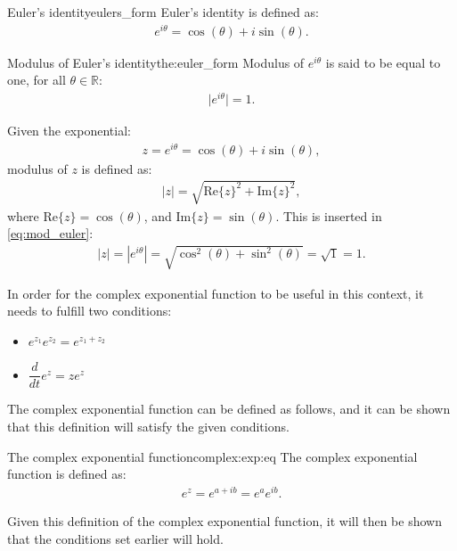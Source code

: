 \begin{definition}{Euler's identity}{eulers_form}
Euler's identity is defined as: \cite[p.~231]{diffandcomplex}
\begin{align}
e^{i\theta}=\cos(\theta)+ i \sin(\theta).
\end{align} 
\end{definition}
\begin{theorem}{Modulus of Euler's identity}{the:euler_form}
Modulus of $e^{i\theta}$ is said to be equal to one, for all $\theta \in \mathbb{R}$:
\begin{align*}
\big|e^{i\theta}\big|=1.
\end{align*}
\end{theorem}
\begin{prof}{}{}
Given the exponential:
\begin{align*}
z=e^{i\theta}=\cos(\theta)+i\sin(\theta),
\end{align*}
modulus of $z$ is defined as:
\begin{align}
|z|=\sqrt{\text{Re}\{z\}^2+\text{Im}\{z\}^2}, \label{eq:mod_euler}
\end{align}
where $\text{Re}\{z\}=\cos(\theta)$, and $\text{Im}\{z\}=\sin(\theta)$. This is inserted in \eqref{eq:mod_euler}:
\begin{align*}
|z|=|e^{i\theta}|=\sqrt{\cos^2(\theta)+\sin^2(\theta)}=\sqrt{1}=1.
\end{align*}
\end{prof}
\noindent In order for the complex exponential function to be useful in this context, it needs to fulfill two conditions:
\begin{itemize}
	\item $e^{z_1}e^{z_2} = e^{z_1 + z_2}$
	\item $\dfrac{d}{dt}e^{z} = ze^{z}$
\end{itemize}
The complex exponential function can be defined as follows, and it can be shown that this definition will satisfy the given conditions.
\\

\begin{definition}{The complex exponential function}{complex:exp:eq}
The complex exponential function is defined as:
\begin{align*}
	e^{z}=e^{a+ib}=e^{a}e^{ib}.
\end{align*}
\end{definition}

\noindent
Given this definition of the complex exponential function, it will then be shown that the conditions set earlier will hold.\\

